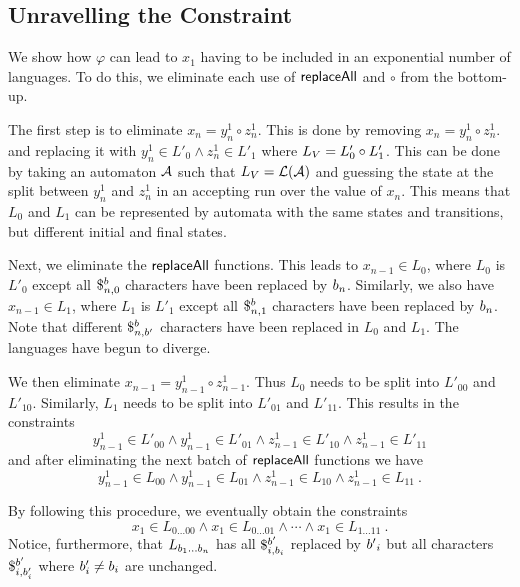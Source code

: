 \documentclass{article}
\newcommand{\concat} {\circ}
\begin{document}
\subsection{Unravelling the Constraint}

We show how $\varphi$ can lead to $x_1$ having to be included in an exponential number of languages.
To do this, we eliminate each use of $\replaceall$ and $\concat$ from the bottom-up.

The first step is to eliminate
$x_n = y^1_n \concat z^1_n$.
This is done by removing
$x_n = y^1_n \concat z^1_n$.
and replacing it with
$y^1_n \in L'_{0} \land z^1_n \in L'_{1}$
where $L_\vcons = L'_{0} \concat L'_{1}$.
This can be done by taking an automaton $\cA$ such that $L_\vcons = \lang{\cA}$ and guessing the state at the split between $y^1_n$ and $z^1_n$ in an accepting run over the value of $x_n$.
This means that $L_{0}$ and $L_{1}$ can be represented by automata with the same states and transitions, but different initial and final states.

Next, we eliminate the $\replaceall$ functions.
This leads to $x_{n-1} \in L_{0}$, where $L_{0}$ is $L'_{0}$ except all $\repl{n}{0}{\bit}$ characters have been replaced by $\nbit{n}{\bit}$.
Similarly, we also have $x_{n-1} \in L_{1}$, where $L_{1}$ is $L'_{1}$ except all $\repl{n}{1}{\bit}$ characters have been replaced by $\nbit{n}{\bit}$.
Note that different $\repl{n}{\bit'}{\bit}$ characters have been replaced in $L_{0}$ and $L_{1}$.
The languages have begun to diverge.

We then eliminate
$x_{n-1} = y^1_{n-1} \concat z^1_{n-1}$.
Thus $L_{0}$ needs to be split into $L'_{00}$ and $L'_{10}$.
Similarly, $L_{1}$ needs to be split into $L'_{01}$ and $L'_{11}$.
This results in the constraints
\[
    y^1_{n-1} \in L'_{00} \land
    y^1_{n-1} \in L'_{01} \land
    z^1_{n-1} \in L'_{10} \land
    z^1_{n-1} \in L'_{11}
\]
and after eliminating the next batch of $\replaceall$ functions we have
\[
    y^1_{n-1} \in L_{00} \land
    y^1_{n-1} \in L_{01} \land
    z^1_{n-1} \in L_{10} \land
    z^1_{n-1} \in L_{11} \ .
\]

By following this procedure, we eventually obtain the constraints
\[
    x_1 \in L_{0\ldots00} \land
    x_1 \in L_{0\ldots01} \land
    \cdots \land
    x_1 \in L_{1\ldots11} \ .
\]
Notice, furthermore, that
$L_{\bit_1 \ldots \bit_n}$
has all
$\repl{i}{\bit_i}{\bit'}$
replaced by $\nbit{i}{\bit'}$
but all characters
$\repl{i}{\bit'_i}{\bit'}$
where
$\bit'_i \neq \bit_i$
are unchanged.
\end{document}
